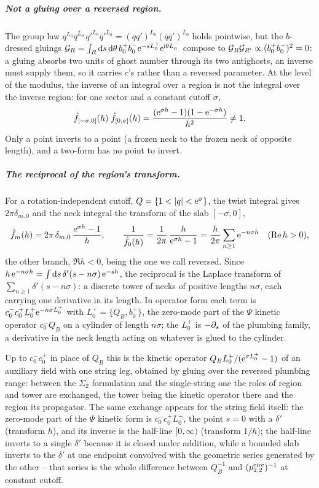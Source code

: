 \subparagraph{Not a gluing over a reversed region.}
The group law $q^{L_0} \bar q^{\bar L_0} \, q'^{L_0} \bar q'^{\bar L_0} = (qq')^{L_0} (\bar q \bar q')^{\bar L_0}$ holds pointwise, but the $b$-dressed gluings ${\mathcal{G}}_R = \int_R \mathrm{d} s \, \mathrm{d}\theta \, b_0^+ b_0^- \mathrm{e}^{-s L_0^+} \mathrm{e}^{\mathrm{i}\theta L_0^-}$ compose to ${\mathcal{G}}_R {\mathcal{G}}_{R'} \propto (b_0^+ b_0^-)^2 = 0$: a gluing absorbs two units of ghost number through its two antighosts, an inverse must supply them, so it carries $c$'s rather than a reversed parameter.
At the level of the modulus, the inverse of an integral over a region is not the integral over the inverse region: for one sector and a constant cutoff $\sigma$,
\begin{equation}
  \label{icg:eq:no-inverse-region}
  \hat f_{[-\sigma, 0]}(h) \; \hat f_{[0, \sigma]}(h)
    = \frac{(\mathrm{e}^{\sigma h} - 1)(1 - \mathrm{e}^{-\sigma h})}{h^2}
    \neq 1 .
\end{equation}
Only a point inverts to a point (a frozen neck to the frozen neck of opposite length), and a two-form has no point to invert.

\subparagraph{The reciprocal of the region's transform.}
For a rotation-independent cutoff, $Q = \{1 < {|q|} < \mathrm{e}^{\sigma}\}$, the twist integral gives $2\pi \delta_{m,0}$ and the neck integral the transform of the slab $[-\sigma, 0]$,
\begin{equation}
  \label{icg:eq:tower}
  \hat f_m(h)
    = 2\pi \, \delta_{m,0} \, \frac{\mathrm{e}^{\sigma h} - 1}{h},
  \qquad
  \frac{1}{\hat f_0(h)}
    = \frac{1}{2\pi} \, \frac{h}{\mathrm{e}^{\sigma h} - 1}
    = \frac{h}{2\pi} \sum_{n \ge 1} \mathrm{e}^{-n \sigma h}
  \quad (\operatorname{Re} h > 0),
\end{equation}
the other branch, $\Re h < 0$, being the one we call reversed.
Since $h \, \mathrm{e}^{-n\sigma h} = \int \mathrm{d} s \, \delta'(s - n\sigma) \, \mathrm{e}^{-sh}$, the reciprocal is the Laplace transform of $\sum_{n \ge 1} \delta'(s - n\sigma)$: a discrete tower of necks of positive lengths $n\sigma$, each carrying one derivative in its length.
In operator form each term is $c_0^- c_0^+ L_0^+ \mathrm{e}^{-n\sigma L_0^+}$ with $L_0^+ = \{Q_B, b_0^+\}$, the zero-mode part of the $\Psi$ kinetic operator $c_0^- Q_B$ on a cylinder of length $n\sigma$; the $L_0^+$ is $-\partial_s$ of the plumbing family, a derivative in the neck length acting on whatever is glued to the cylinder.

Up to $c_0^- c_0^+$ in place of $Q_B$ this is the kinetic operator $Q_B L_0^+ / (\mathrm{e}^{\sigma L_0^+} - 1)$ of an auxiliary field with one string leg, obtained by gluing over the reversed plumbing range: between the $\Sigma_2$ formulation and the single-string one the roles of region and tower are exchanged, the tower being the kinetic operator there and the region its propagator.
The same exchange appears for the string field itself: the zero-mode part of the $\Psi$ kinetic form is $c_0^- c_0^+ L_0^+$, the point $s = 0$ with a $\delta'$ (transform $h$), and its inverse is the half-line $[0, \infty)$ (transform $1/h$); the half-line inverts to a single $\delta'$ because it is closed under addition, while a bounded slab inverts to the $\delta'$ at one endpoint convolved with the geometric series generated by the other – that series is the whole difference between $Q_B^{-1}$ and $(p^{\rm circ}_{2,2})^{-1}$ at constant cutoff.

